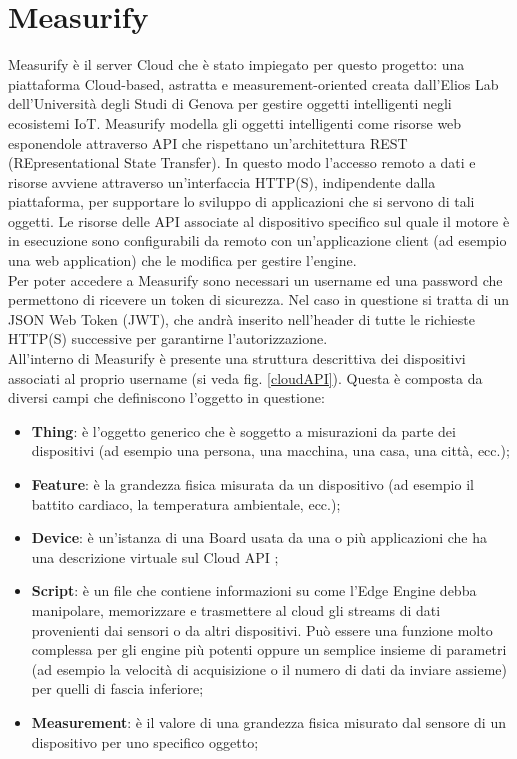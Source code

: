 \section{Measurify}
Measurify è il server Cloud che è stato impiegato per questo progetto: una piattaforma Cloud-based, astratta e measurement-oriented creata dall'Elios Lab dell'Università degli Studi di Genova per gestire oggetti intelligenti negli ecosistemi IoT. Measurify modella gli oggetti intelligenti come risorse web esponendole attraverso API che rispettano un'architettura REST (REpresentational State Transfer). In questo modo l'accesso remoto a dati e risorse avviene attraverso un'interfaccia HTTP(S), indipendente dalla piattaforma, per supportare lo sviluppo di applicazioni che si servono di tali oggetti. Le risorse delle API associate al dispositivo specifico sul quale il motore è in esecuzione sono configurabili da remoto con un'applicazione client (ad esempio una web application) che le modifica per gestire l'engine. \\
Per poter accedere a Measurify sono necessari un username ed una password che permettono di ricevere un token di sicurezza. Nel caso in questione si tratta di un JSON Web Token (JWT), che andrà inserito nell'header di tutte le richieste HTTP(S) successive per garantirne l'autorizzazione.\\
All'interno di Measurify è presente una struttura descrittiva dei dispositivi associati al proprio username  (si veda fig. \ref{cloudAPI}). Questa è composta da diversi campi che definiscono l'oggetto in questione:
\begin{itemize}
	\item \textbf{Thing}: è  l'oggetto generico che è soggetto a misurazioni da parte dei dispositivi (ad esempio una persona, una macchina, una casa, una città, ecc.);
	\item \textbf{Feature}: è la grandezza fisica misurata da un dispositivo (ad esempio il battito cardiaco, la temperatura ambientale, ecc.);
	\item \textbf{Device}: è un'istanza di una Board usata da una o più applicazioni che
	ha una descrizione virtuale sul Cloud API ;
	\item \textbf{Script}: è un file che contiene informazioni su come l'Edge Engine debba manipolare, memorizzare e trasmettere al cloud gli streams di dati provenienti dai sensori o da altri dispositivi. Può essere una funzione molto complessa per gli engine più potenti oppure un semplice insieme di parametri (ad esempio la velocità di acquisizione o il numero di dati da inviare assieme) per quelli di fascia inferiore;
	\item \textbf{Measurement}: è il valore di una grandezza fisica misurato dal sensore
	di un dispositivo per uno specifico oggetto;
\end{itemize}
